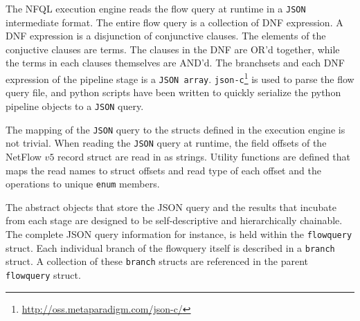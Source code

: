 The \ac{NFQL} execution engine reads the flow query at runtime in a
\texttt{JSON} intermediate format. The entire flow query is a collection of
\ac{DNF} expression. A \ac{DNF} expression is a disjunction of conjunctive
clauses. The elements of the conjuctive clauses are terms. The clauses in the
\ac{DNF} are OR'd together, while the terms in each clauses themselves are
AND'd. The branchsets and each \ac{DNF} expression of the pipeline stage is a
\texttt{JSON array}. \texttt{json-c}\footnote{\url{http://oss.metaparadigm.com/json-c/}} is used to
parse the flow query file, and python scripts have been written to quickly
serialize the python pipeline objects to a \texttt{JSON} query.


The mapping of the \texttt{JSON} query to the structs defined in the execution
engine is not trivial. When reading the \texttt{JSON} query at runtime, the
field offsets of the NetFlow $v5$ record struct are read in as strings.
Utility functions are defined that maps the read names to struct offsets and
read type of each offset and the operations to unique \texttt{enum} members.

The abstract objects that store the JSON query and the results that incubate
from each stage are designed to be self-descriptive and hierarchically
chainable. The complete JSON query information for instance, is held within
the \texttt{flowquery} struct. Each individual branch of the flowquery itself
is described in a \texttt{branch} struct. A collection of these
\texttt{branch} structs are referenced in the parent \texttt{flowquery}
struct.
